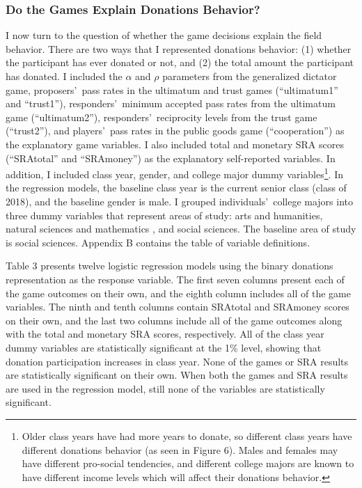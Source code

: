 \documentclass[12pt]{article}
\begin{document}
\subsubsection{Do the Games Explain Donations Behavior?}
I now turn to the question of whether the game decisions explain the field behavior. There are two ways that I represented donations behavior: (1) whether the participant has ever donated or not, and (2) the total amount the participant has donated. I included the \(\alpha\) and \(\rho\) parameters from the generalized dictator game, proposers\rq \ pass rates in the ultimatum and trust games (``ultimatum1'' and ``trust1''), responders\rq \ minimum accepted pass rates from the ultimatum game (``ultimatum2''), responders\rq \ reciprocity levels from the trust game (``trust2''), and players\rq \ pass rates in the public goods game (``cooperation'') as the explanatory game variables. I also included total and monetary SRA scores (``SRAtotal'' and ``SRAmoney'') as the explanatory self-reported variables. In addition, I included class year, gender, and college major dummy variables\footnote{Older class years have had more years to donate, so different class years have different donations behavior (as seen in Figure 6). Males and females may have different pro-social tendencies, and different college majors are known to have different income levels which will affect their donations behavior.}. In the regression models, the baseline class year is the current senior class (class of 2018), and the baseline gender is male. I grouped individuals\rq \ college majors into three dummy variables that represent areas of study: arts and humanities, natural sciences and mathematics , and social sciences. The baseline area of study is social sciences. Appendix B contains the table of variable definitions. 

Table 3 presents twelve logistic regression models using the binary donations representation as the response variable. The first seven columns present each of the game outcomes on their own, and the eighth column includes all of the game variables. The ninth and tenth columns contain SRAtotal and SRAmoney scores on their own, and the last two columns include all of the game outcomes along with the total and monetary SRA scores, respectively. All of the class year dummy variables are statistically significant at the 1\% level, showing that donation participation increases in class year. None of the games or SRA results are statistically significant on their own. When both the games and SRA results are used in the regression model, still none of the variables are statistically significant. 
\end{document}
